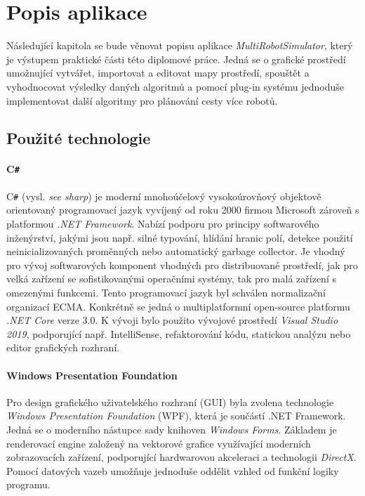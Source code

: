 \clearpage
\chapter{Popis aplikace}
Následující kapitola se bude věnovat popisu aplikace \emph{MultiRobotSimulator}, který je výstupem praktické části této diplomové práce. Jedná se o grafické prostředí umožnující vytvářet, importovat a editovat mapy prostředí, spouštět a vyhodnocovat výsledky daných algoritmů a pomocí plug-in systému jednoduše implementovat další algoritmy pro plánování cesty více robotů.

\section{Použité technologie}
\subsubsection{C\texttt{\#}}
C\texttt{\#} (vysl. \emph{see sharp}) je moderní mnohoúčelový vysokoúrovňový objektově orientovaný programovací jazyk vyvíjený od roku 2000 firmou Microsoft zároveň s platformou \emph{.NET Framework}. Nabízí podporu pro principy softwarového inženýrství, jakými jsou např. silné typování, hlídání hranic polí, detekce použití neinicializovaných proměnných nebo automatický garbage collector. Je vhodný pro vývoj softwarových komponent vhodných pro distribuované prostředí, jak pro velká zařízení se sofistikovanými operačními systémy, tak pro malá zařízení s omezenými funkcemi. Tento programovací jazyk byl schválen normalizační organizací ECMA. \cite{ECMA} Konkrétně se jedná o multiplatformní open-source platformu \emph{.NET Core} verze 3.0. K vývoji bylo použito vývojové prostředí \emph{Visual Studio 2019}, podporující např. IntelliSense, refaktorování kódu, statickou analýzu nebo editor grafických rozhraní. \cite{MSDOCS}

\subsubsection{Windows Presentation Foundation}
Pro design grafického uživatelského rozhraní (GUI) byla zvolena technologie \emph{Windows Presentation Foundation} (WPF), která je součástí .NET Framework. Jedná se o moderního nástupce sady knihoven \emph{Windows Forms}. Základem je renderovací engine založený na vektorové grafice využívající moderních zobrazovacích zařízení, podporující hardwarovou akceleraci a technologii \emph{DirectX}. Pomocí datových vazeb umožňuje jednoduše oddělit vzhled od funkční logiky programu. \cite{MSDOCS}


